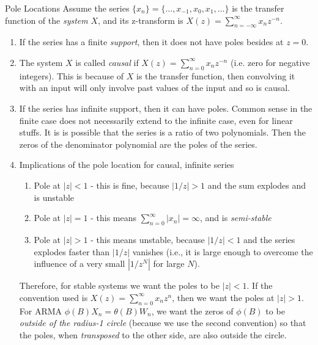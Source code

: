 \documentclass{article}
\begin{document}
\begin{section}{Pole Locations}
Assume the series $\{x_{n}\} = \{\ldots, x_{-1}, x_{0}, x_{1}, \ldots\}$ 
is the transfer function of the \emph{system} $X$, and its z-transform is 
$X(z) = \sum_{n=-\infty}^{\infty} x_{n} z^{-n}$.
\begin{enumerate}
\item If the series has a finite \emph{support}, then it does not have poles
besides at $z = 0$.
\item The system $X$ is called \emph{causal} if 
$X(z) = \sum_{n=0}^{\infty} x_{n} z^{-n}$ (i.e. zero for negative integers). 
This is because of $X$ is the transfer function, then convolving it with
an input will only involve past values of the input and so is causal.
\item If the series has infinite support, then it can have poles. Common
sense in the finite case does not necessarily extend to the infinite case,
even for linear stuffs. It is is possible that the series is a 
ratio of two polynomials. Then the zeros of the denominator polynomial
are the poles of the series.
\item Implications of the pole location for causal, infinite series
  \begin{enumerate}
  \item Pole at $|z| < 1$ - this is fine, because $|1/z| > 1$ and the sum
  explodes and is unstable
  \item Pole at $|z| = 1$ - this means $\sum_{n=0}^{\infty} |x_{n}| = \infty$,
  and is \emph{semi-stable}
  \item Pole at $|z| > 1$ - this means unstable, because $|1/z| < 1$ and
  the series explodes faster than $|1/z|$ vanishes (i.e., it is large enough
  to overcome the influence of a very small $|1/z^{N}|$ for large $N$).
  \end{enumerate}
\noindent Therefore, for stable systems we want the poles to be $|z| < 1$. 
If the convention used is $X(z) = \sum_{n=0}^{\infty} x_{n} z^{n}$, then
we want the poles at $|z| > 1$.\\
For ARMA $\phi(B)X_{n} = \theta(B)W_{n}$, we want the zeros of $\phi(B)$ to
be \emph{outside of the radius-1 circle} (because we use the second convention)
so that the poles, when \emph{transposed} to the other side, are also
outside the circle.
\end{enumerate}
\end{section}
\end{document}
